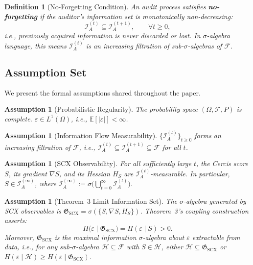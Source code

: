 \documentclass[12pt,a4paper]{article}
\newtheorem{definition}[theorem]{Definition}
\newtheorem{assumption}[theorem]{Assumption}
\newcommand{\cI}{\mathcal{I}}
\newcommand{\sG}{\mathfrak{G}}
\begin{document}
\begin{definition}[No-Forgetting Condition]
\label{def:no-forgetting}
An audit process satisfies \textbf{no-forgetting} if the auditor's information set is monotonically non-decreasing:
\begin{equation}\label{eq:no-forgetting}
    \cI_A^{(t)} \subseteq \cI_A^{(t+1)}, \qquad \forall t\geq0,
\end{equation}
i.e., previously acquired information is never discarded or lost. In $\sigma$-algebra language, this means $\cI_A^{(t)}$ is an increasing filtration of sub-$\sigma$-algebras of $\mathcal{F}$.
\end{definition}

\subsection{Assumption Set}

We present the formal assumptions shared throughout the paper.

\begin{assumption}[Probabilistic Regularity]
\label{ass:prob}
The probability space $(\Omega, \mathcal{F}, P)$ is complete. $\varepsilon \in L^1(\Omega)$, i.e., $\mathbb{E}[|\varepsilon|] < \infty$.
\end{assumption}

\begin{assumption}[Information Flow Measurability]
\label{ass:filtration}
$\{\cI_A^{(t)}\}_{t \ge 0}$ forms an increasing filtration of $\mathcal{F}$, i.e., $\cI_A^{(t)} \subseteq \cI_A^{(t+1)} \subseteq \mathcal{F}$ for all $t$.
\end{assumption}

\begin{assumption}[SCX Observability]
\label{ass:scx}
For all sufficiently large $t$, the Cercis score $S$, its gradient $\nabla S$, and its Hessian $H_S$ are $\cI_A^{(t)}$-measurable. In particular, $S \in \cI_A^{(\infty)}$, where $\cI_A^{(\infty)} := \sigma\bigl(\bigcup_{t=0}^\infty \cI_A^{(t)}\bigr)$.
\end{assumption}

\begin{assumption}[Theorem~3 Limit Information Set]
\label{ass:t3}
The $\sigma$-algebra generated by SCX observables is $\sG_{\mathrm{SCX}} = \sigma(\{S, \nabla S, H_S\})$. Theorem~3's coupling construction asserts:
\[
H\bigl(\varepsilon \mid \sG_{\mathrm{SCX}}\bigr) = H(\varepsilon \mid S) > 0.
\]
Moreover, $\sG_{\mathrm{SCX}}$ is the maximal information $\sigma$-algebra about $\varepsilon$ extractable from data, i.e., for any sub-$\sigma$-algebra $\mathcal{H} \subseteq \mathcal{F}$ with $S \in \mathcal{H}$, either $\mathcal{H} \subseteq \sG_{\mathrm{SCX}}$ or $H(\varepsilon \mid \mathcal{H}) \ge H(\varepsilon \mid \sG_{\mathrm{SCX}})$.
\end{assumption}
\end{document}
